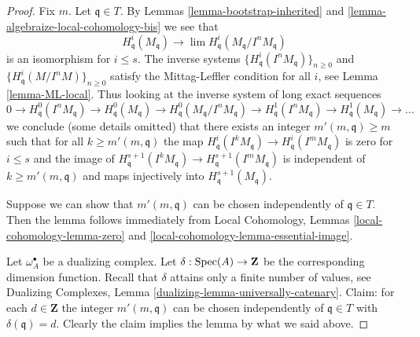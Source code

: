 \begin{proof}
Fix $m$. Let $\mathfrak q \in T$.
By Lemmas \ref{lemma-bootstrap-inherited} and
\ref{lemma-algebraize-local-cohomology-bis}
we see that
$$
H^i_\mathfrak q(M_\mathfrak q)
\longrightarrow
\lim H^i_\mathfrak q(M_\mathfrak q/I^nM_\mathfrak q)
$$
is an isomorphism for $i \leq s$. The inverse systems
$\{H^i_\mathfrak q(I^nM_\mathfrak q)\}_{n \geq 0}$ and
$\{H^i_\mathfrak q(M/I^nM)\}_{n \geq 0}$
satisfy the Mittag-Leffler condition for all $i$, see
Lemma \ref{lemma-ML-local}. Thus looking at the inverse system of
long exact sequences
$$
0 \to H^0_\mathfrak q(I^nM_\mathfrak q) \to
H^0_\mathfrak q(M_\mathfrak q) \to
H^0_\mathfrak q(M_\mathfrak q/I^nM_\mathfrak q) \to
H^1_\mathfrak q(I^nM_\mathfrak q) \to
H^1_\mathfrak q(M_\mathfrak q) \to \ldots
$$
we conclude (some details omitted) that there exists an integer
$m'(m, \mathfrak q) \geq m$ such that for all $k \geq m'(m, \mathfrak q)$
the map
$H^i_\mathfrak q(I^kM_\mathfrak q) \to H^i_\mathfrak q(I^mM_\mathfrak q)$
is zero for $i \leq s$ and the image of
$H^{s + 1}_\mathfrak q(I^kM_\mathfrak q) \to
H^{s + 1}_\mathfrak q(I^mM_\mathfrak q)$
is independent of $k \geq m'(m, \mathfrak q)$ and
maps injectively into $H^{s + 1}_\mathfrak q(M_\mathfrak q)$.

\medskip\noindent
Suppose we can show that $m'(m, \mathfrak q)$ can be chosen
independently of $\mathfrak q \in T$.
Then the lemma follows immediately from
Local Cohomology, Lemmas \ref{local-cohomology-lemma-zero} and
\ref{local-cohomology-lemma-essential-image}.

\medskip\noindent
Let $\omega_A^\bullet$ be a dualizing complex. Let
$\delta : \mathop{\mathrm{Spec}}(A) \to \mathbf{Z}$ be the corresponding
dimension function. Recall that $\delta$ attains only a
finite number of values, see
Dualizing Complexes, Lemma \ref{dualizing-lemma-universally-catenary}.
Claim: for each $d \in \mathbf{Z}$ the integer
$m'(m, \mathfrak q)$ can be chosen independently
of $\mathfrak q \in T$ with $\delta(\mathfrak q) = d$.
Clearly the claim implies the lemma by what we said above.


\end{proof}
